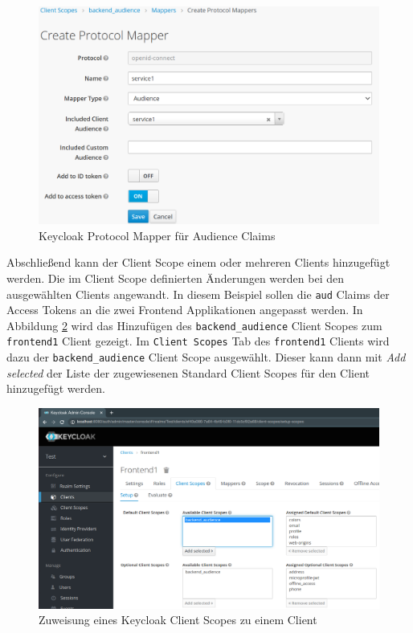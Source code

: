\begin{figure}[!ht]
	\centering
	\includegraphics[width=1\textwidth]{Images/Ebert/KeycloakNewAudProtocolMapper.PNG}
	\caption{Keycloak Protocol Mapper für Audience Claims}
	\label{fig:EB_Keycloak Protocol Mapper für Audience Claim}
\end{figure}

Abschließend kann der Client Scope einem oder mehreren Clients hinzugefügt werden. Die im Client Scope definierten Änderungen werden bei den ausgewählten Clients angewandt. In diesem Beispiel sollen die \texttt{aud} Claims der Access Tokens an die zwei Frontend Applikationen angepasst werden. In Abbildung \ref{fig:EB_Keycloak Client Scope einem Client zuweisen} wird das Hinzufügen des \texttt{backend\_audience} Client Scopes zum \texttt{frontend1} Client gezeigt. Im \texttt{Client Scopes} Tab des \texttt{frontend1} Clients wird dazu der \texttt{backend\_audience} Client Scope ausgewählt. Dieser kann dann mit \textit{Add selected} der Liste der zugewiesenen Standard Client Scopes für den Client hinzugefügt werden.

\begin{figure}[!ht]
	\centering
	\includegraphics[width=1\textwidth]{Images/Ebert/KeycloakAddAudClientScope.PNG}
	\caption{Zuweisung eines Keycloak Client Scopes zu einem Client}
	\label{fig:EB_Keycloak Client Scope einem Client zuweisen}
\end{figure}

